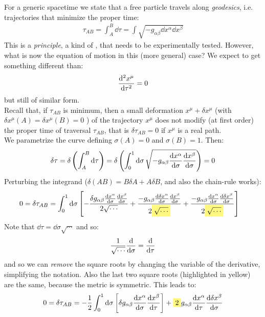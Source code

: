 \documentclass[../template.tex]{subfiles}
\begin{document}
For a generic spacetime we state that a free particle travels along \textit{geodesics}, i.e. trajectories that minimize the proper time:
\begin{align*}
    \tau_{A B} = \int_A^B \dd{\tau} = \int \sqrt{-g_{\alpha \beta} \dd{x^\alpha}\dd{x^\beta}}
\end{align*} 
This is a \textit{principle}, a kind of , that needs to be experimentally tested. However, what is now the equation of motion in this (more general) case? We expect to get something different than:
\begin{align*}
    \dv[2]{x^\mu}{\tau} = 0
\end{align*} 
but still of similar form.\\
Recall that, if $\tau_{AB}$ is minimum, then a small deformation $x^\mu + \delta x^\mu $ (with $\delta x^\mu (A) = \delta x^\mu (B) = 0 $ )  of the trajectory $x^\mu$  does not modify (at first order) the proper time of traversal $\tau_{AB}$, that is $\delta \tau_{AB} = 0$ if $x^\mu$ is a real path.\\
We parametrize the curve defining $\sigma(A) = 0$ and $\sigma(B) = 1$. Then:
\begin{align*}
    \delta \tau = \delta \left(\int_A^B \dd{\tau}\right) = \delta \left(\int_0^1 \dd{\sigma} \sqrt{-g_{\alpha \beta} \dv{x^\alpha}{\sigma} \dv{x^\beta}{\sigma}}\right) = 0
\end{align*}   
Perturbing the integrand ($\delta(AB) = B \delta A + A \delta B$, and also the chain-rule works):
\begin{align*}
    0 &= \delta \tau_{AB}  = \int_0^1 \dd{\sigma} \left[
    -\frac{\delta g_{\alpha \beta} \dv{x^\alpha}{\sigma} \dv{x^\beta}{\sigma}}{2 \sqrt{\cdots}} + \frac{-g_{\alpha \beta} \dv{\delta x^\alpha}{\sigma} \dv{x^\beta}{\sigma}}{2\hlc{Yellow}{ \sqrt{\cdots}}} + \frac{-g_{\alpha \beta} \dv{x^\alpha}{\sigma} \dv{\delta x^\beta}{\sigma}}{2\hlc{Yellow}{ \sqrt{\cdots}}}       
    \right]
\end{align*}
Note that $\dd{\tau} = \dd{\sigma} \sqrt{\cdots} $ and so:
\begin{align*}
    \frac{1}{\sqrt{\cdots}} \dv{\sigma} = \dv{\tau} 
\end{align*} 
and so we can \textit{remove} the square roots by changing the variable of the derivative, simplifying the notation. Also the last two square roots (highlighted in yellow) are the same, because the metric is symmetric. This leads to:
\begin{align*}
    0 = \delta \tau_{A B} = - \frac{1}{2} \int_0^1 \dd{\sigma \left[ \delta g_{\alpha \beta} \dv{x^\alpha}{\sigma} \dv{x^\beta}{\tau} \right] + \hlc{Yellow}{2} g_{\alpha \beta} \dv{x^\alpha}{\tau}\dv{\delta x^\beta }{\sigma}} 
\end{align*}
\end{document}
